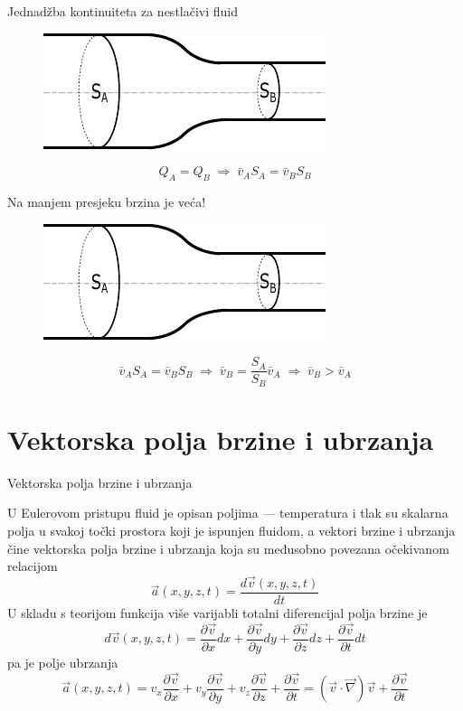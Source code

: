 \documentclass[croatian]{beamer}
\begin{document}
\begin{frame}{Jednadžba kontinuiteta za nestlačivi fluid}

\begin{figure}
\includegraphics[scale=1.35]{slike/jdba-kont-cijev}
\end{figure}
\[
Q_{A}=Q_{B}\;\Rightarrow\;\bar{v}_{A}S_{A}=\bar{v}_{B}S_{B}
\]
\end{frame}

\begin{frame}{Na manjem presjeku brzina je veća!}

\begin{figure}
\includegraphics[scale=1.35]{slike/jdba-kont-cijev}
\end{figure}
 \[
\bar{v}_{A}S_{A}=\bar{v}_{B}S_{B}\;\Rightarrow\;\bar{v}_{B}=\frac{S_{A}}{S_{B}}\bar{v}_{A}\;\Rightarrow\;\bar{v}_{B}>\bar{v}_{A}
\]
\end{frame}


\section{Vektorska polja brzine i ubrzanja}

\begin{frame}{Vektorska polja brzine i ubrzanja}

U Eulerovom pristupu fluid je opisan poljima --- temperatura i tlak
su skalarna polja u svakoj točki prostora koji je ispunjen fluidom,
a vektori brzine i ubrzanja čine vektorska polja brzine i ubrzanja
koja su međusobno povezana očekivanom relacijom
\[
\vec{a}(x,y,z,t)=\frac{d\vec{v}(x,y,z,t)}{dt}
\]
U skladu s teorijom funkcija više varijabli totalni diferencijal polja
brzine je
\[
d\vec{v}(x,y,z,t)=\frac{\partial\vec{v}}{\partial x}dx+\frac{\partial\vec{v}}{\partial y}dy+\frac{\partial\vec{v}}{\partial z}dz+\frac{\partial\vec{v}}{\partial t}dt
\]
pa je polje ubrzanja
\[
\vec{a}(x,y,z,t)=v_{x}\frac{\partial\vec{v}}{\partial x}+v_{y}\frac{\partial\vec{v}}{\partial y}+v_{z}\frac{\partial\vec{v}}{\partial z}+\frac{\partial\vec{v}}{\partial t}=(\vec{v}\cdot\vec{\nabla})\vec{v}+\frac{\partial\vec{v}}{\partial t}
\]
\end{frame}
\end{document}
